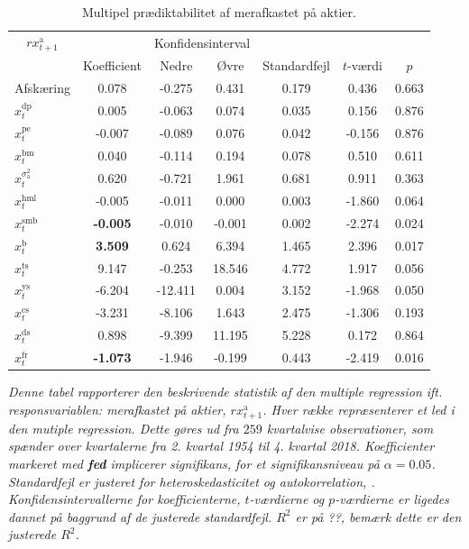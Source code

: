 \documentclass[
  a4paper,
  oneside]{memoir}
\begin{document}
\begin{table}[H]

\caption{\label{tab:MULT-ak}Multipel prædiktabilitet af merafkastet på aktier.}
\centering
\begin{threeparttable}
\begin{tabular}[t]{lcccccc}
\toprule
\multicolumn{1}{c}{$rx_{t+1}^{\text{a}}$} & \multicolumn{1}{c}{ } & \multicolumn{2}{c}{Konfidensinterval} & \multicolumn{3}{c}{ } \\
\cmidrule(l{3pt}r{3pt}){1-1} \cmidrule(l{3pt}r{3pt}){3-4}
  & Koefficient & Nedre & Øvre & Standardfejl & $t$-værdi & $p$\\
\midrule
\rowcolor{gray!6}  Afskæring & 0.078 & -0.275 & 0.431 & 0.179 & 0.436 & 0.663\\
$x_t^{\text{dp}}$ & 0.005 & -0.063 & 0.074 & 0.035 & 0.156 & 0.876\\
\rowcolor{gray!6}  $x_t^{\text{pe}}$ & -0.007 & -0.089 & 0.076 & 0.042 & -0.156 & 0.876\\
$x_t^{\text{bm}}$ & 0.040 & -0.114 & 0.194 & 0.078 & 0.510 & 0.611\\
\rowcolor{gray!6}  $x_t^{\sigma_{\text{a}}^2}$ & 0.620 & -0.721 & 1.961 & 0.681 & 0.911 & 0.363\\
$x_t^{\text{hml}}$ & -0.005 & -0.011 & 0.000 & 0.003 & -1.860 & 0.064\\
\rowcolor{gray!6}  $x_t^{\text{smb}}$ & \textbf{-0.005} & -0.010 & -0.001 & 0.002 & -2.274 & 0.024\\
$x_t^{\text{b}}$ & \textbf{ 3.509} & 0.624 & 6.394 & 1.465 & 2.396 & 0.017\\
\rowcolor{gray!6}  $x_t^{\text{ts}}$ & 9.147 & -0.253 & 18.546 & 4.772 & 1.917 & 0.056\\
$x_t^{\text{ys}}$ & -6.204 & -12.411 & 0.004 & 3.152 & -1.968 & 0.050\\
\rowcolor{gray!6}  $x_t^{\text{cs}}$ & -3.231 & -8.106 & 1.643 & 2.475 & -1.306 & 0.193\\
$x_t^{\text{ds}}$ & 0.898 & -9.399 & 11.195 & 5.228 & 0.172 & 0.864\\
\rowcolor{gray!6}  $x_t^{\text{fr}}$ & \textbf{-1.073} & -1.946 & -0.199 & 0.443 & -2.419 & 0.016\\
\bottomrule
\end{tabular}
\begin{tablenotes}
\item \textit{Denne tabel rapporterer den beskrivende statistik af den multiple regression ift. responsvariablen: merafkastet på aktier, $rx_{t+1}^{\text{a}}$. Hver række repræsenterer et led i den mutiple regression. Dette gøres ud fra $259$ kvartalvise observationer, som spænder over kvartalerne fra 2. kvartal 1954 til 4. kvartal 2018. Koefficienter markeret med \textbf{fed} implicerer signifikans, for et signifikansniveau på $\alpha=0.05$. Standardfejl er justeret for heteroskedasticitet og autokorrelation, \citep{Newey1987}. Konfidensintervallerne for koefficienterne, $t$-værdierne og $p$-værdierne er ligedes dannet på baggrund af de justerede standardfejl. $R^2$ er på ??, bemærk dette er den justerede $R^2$.}
\end{tablenotes}
\end{threeparttable}
\end{table}
\end{document}
